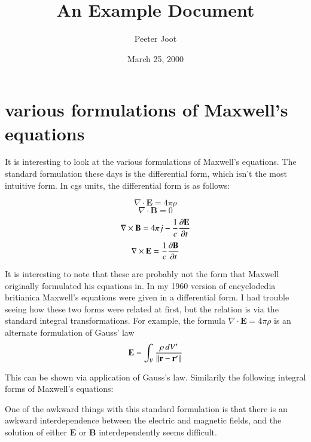 \documentclass{article}      %
\title{An Example Document}  %
\author{Peeter Joot}         %
\date{March 25, 2000}        %
\newcommand{\norm}[1]{\lVert#1\rVert}
\newcommand{\Curl}[1]{\nabla \times \mathbf{#1}}
\newcommand{\Diverg}[1]{\nabla \cdot \mathbf{#1}}
\newcommand{\Ddt}[1]{ {{\partial{\mathbf{#1}}} \over {\partial{t}}}}
\begin{document}


\section{various formulations of Maxwell's equations}

It is interesting to look at the various formulations of Maxwell's 
equations.  The standard formulation these days is the differential
form, which isn't the most intuitive form.  In cgs units, the differential
form is as follows:

\begin{equation}
\Diverg E = 4\pi\rho
\end{equation}
\begin{equation}
\Diverg B = 0
\end{equation}
\begin{equation}
\Curl{B} = 4\pi j - {1 \over c} {\Ddt{E}}
\end{equation}
\begin{equation}
\Curl{E} = {1 \over c} {\Ddt{B}}
\end{equation}

It is interesting to note that these are probably not the form that Maxwell 
originally formulated his equations in.  In my 1960 version of encyclodedia 
britianica Maxwell's equations were given in a differential form.  I had 
trouble seeing how these two forms were related at first, but the relation
is via the standard integral transformations.  For example, the formula $\Diverg E = 4\pi\rho$ is an alternate formulation of Gauss' law
\begin{equation*}
\mathbf{E} = \int_V{{\rho\,dV' \over \norm{\mathbf r - \mathbf r'}}}
\end{equation*}

This can be shown via application of Gauss's law.  Similarily the following 
integral forms of Maxwell's equations:


One of the awkward things with this standard formulation is that there 
is an awkward interdependence between the electric and magnetic fields, and 
the solution of either $\mathbf{E}$ or $\mathbf{B}$ interdependently seems difficult.
\end{document}
